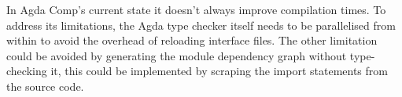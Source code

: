  In Agda Comp's current state it doesn't always improve compilation times. To
 address its limitations, the Agda type checker itself needs to be parallelised
 from within to avoid the overhead of reloading interface files. The other
 limitation could be avoided by generating the module dependency graph without
 type-checking it, this could be implemented by scraping the import statements
 from the source code.

%
